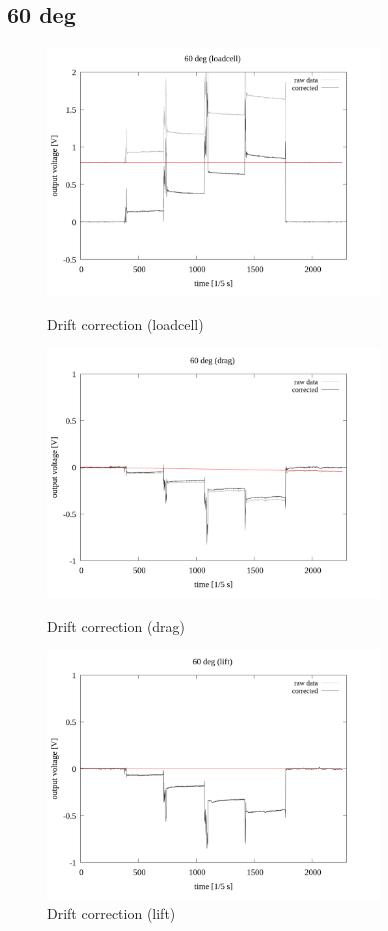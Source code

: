 \documentclass[twocolumn,a4j]{jsarticle}
\begin{document}
\newpage
\subsection{60 deg}
\begin{figure}[htbp]
    \footnotesize
    \begin{center}
        \includegraphics[width=88mm]{../images/drift/60_loadcell_drift.png}
        \caption{Drift correction (loadcell)}
        \includegraphics[width=88mm]{../images/drift/60_drag_drift.png}
        \caption{Drift correction (drag)}
        \includegraphics[width=88mm]{../images/drift/60_lift_drift.png}
        \caption{Drift correction (lift)}
    \end{center}
\end{figure}
\end{document}
